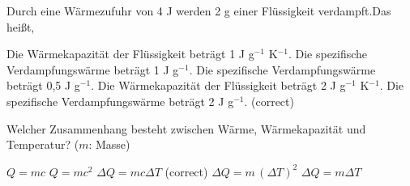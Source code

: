 \documentclass[11pt]{exam}
\begin{document}
\begin{questions}
\vspace{3mm}\question Durch eine Wärmezufuhr von 4 J werden 2 g einer Flüssigkeit verdampft.Das heißt,

\begin{choices}
	\choice Die Wärmekapazität der Flüssigkeit beträgt 1 J g\(^{-1}\) K\(^{-1}\).
	\choice Die spezifische Verdampfungswärme beträgt 1 J g\(^{-1}\).
	\choice Die spezifische Verdampfungswärme beträgt 0,5 J g\(^{-1}\).
	\choice Die Wärmekapazität der Flüssigkeit beträgt 2 J g\(^{-1}\) K\(^{-1}\).
	\choice Die spezifische Verdampfungswärme beträgt 2 J g\(^{-1}\). (correct)
\end{choices}

\vspace{3mm}\question Welcher Zusammenhang besteht zwischen Wärme, Wärmekapazität und Temperatur? (\(m\): Masse)

\begin{choices}
	\choice \(Q = m c\)
	\choice \(Q = m c^2\)
	\choice \(\Delta Q = m c \Delta T\) (correct)
	\choice \(\Delta Q = m \, (\Delta T)^2\)
	\choice \(\Delta Q = m \Delta T\)
\end{choices}

\vspace{3mm}\end{questions}
\end{document}
